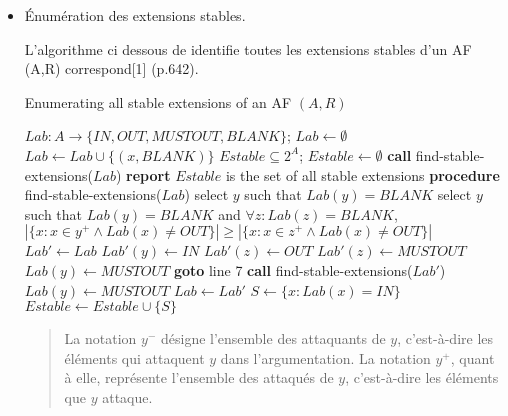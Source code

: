 \documentclass{rapportECL}
\begin{document}
\begin{itemize}
    \item Énumération des extensions stables.
    
	L'algorithme ci dessous de identifie toutes les extensions stables d’un AF (A,R) correspond[1] (p.642).
	\begin{algorithm}
		\caption{Enumerating all stable extensions of an AF $(A, R)$}
		\begin{algorithmic}[1]
			\STATE $Lab : A \to \{IN, OUT, MUST OUT, BLANK\}$; $Lab \gets \emptyset$
				\STATE $Lab \gets Lab \cup \{(x, BLANK)\}$
			\ENDFOR
			\STATE $Estable \subseteq 2^A$; $Estable \gets \emptyset$
			\STATE \textbf{call} find-stable-extensions($Lab$)
			\STATE \textbf{report} $Estable$ is the set of all stable extensions
			\STATE \textbf{procedure} find-stable-extensions($Lab$)
					\STATE select $y$ such that $Lab(y) = BLANK$
				\ELSE
					\STATE select $y$ such that $Lab(y) = BLANK$ and $\forall z : Lab(z) = BLANK$, 
					\STATE $\left| \{x : x \in {y}^+ \land Lab(x) \neq OUT \} \right| \geq \left| \{x : x \in {z}^+ \land Lab(x) \neq OUT \} \right|$
				\ENDIF
				\STATE $Lab' \gets Lab$
				\STATE $Lab'(y) \gets IN$
					\STATE $Lab'(z) \gets OUT$
				\ENDFOR
						\STATE $Lab'(z) \gets MUST OUT$
					\ENDIF
						\STATE $Lab(y) \gets MUST OUT$
					\ENDIF
				\ENDFOR
				\STATE \textbf{goto} line 7
				\STATE \textbf{call} find-stable-extensions($Lab'$)
					\STATE $Lab(y) \gets MUST OUT$
				\ELSE
					\STATE $Lab \gets Lab'$
				\ENDIF
					\STATE $S \gets \{x : Lab(x) = IN\}$
					\STATE $Estable \gets Estable \cup \{S\}$
				\ENDIF
			\ENDWHILE
		\end{algorithmic}
	\end{algorithm}
	\begin{quote}
		La notation \( y^- \) désigne l'ensemble des attaquants de \( y \), c'est-à-dire les éléments qui attaquent \( y \) dans l'argumentation. La notation \( y^+ \), quant à elle, représente l'ensemble des attaqués de \( y \), c'est-à-dire les éléments que \( y \) attaque.
	\end{quote}	
\end{itemize}
\end{document}
